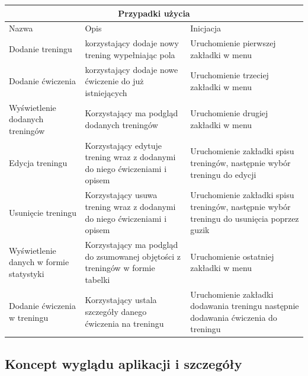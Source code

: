 \documentclass[8pt]{article}
\begin{document}
\renewcommand{\arraystretch}{1}
\begin{tabular}{ | p{5.2cm} | p{5.2cm} | p{5.2cm} | }
  \hline
  \multicolumn{3}{|c|}{Przypadki użycia} \\\hline
  Nazwa & Opis & Inicjacja \\\hline
  Dodanie treningu & korzystający dodaje nowy trening wypełniając pola & Uruchomienie
  pierwszej zakładki w menu \\\hline
  Dodanie ćwiczenia & korzystający dodaje nowe ćwiczenie do już istniejących & Uruchomienie trzeciej zakładki w menu \\\hline
  Wyświetlenie dodanych treningów & Korzystający ma podgląd dodanych treningów & Uruchomienie drugiej zakładki w menu \\\hline
  Edycja treningu & Korzystający edytuje trening wraz z dodanymi do niego ćwiczeniami i opisem & Uruchomienie zakładki spisu treningów, następnie wybór treningu do edycji \\\hline
  Usunięcie treningu & Korzystający usuwa trening wraz z dodanymi do niego ćwiczeniami i opisem & Uruchomienie zakładki spisu treningów, następnie wybór treningu do usunięcia poprzez guzik \\\hline
  Wyświetlenie danych w formie statystyki & Korzystający ma podgląd do zsumowanej objętości z treningów w formie tabelki & Uruchomienie ostatniej zakładki w menu \\\hline
  Dodanie ćwiczenia w treningu & Korzystający ustala szczegóły danego ćwiczenia na treningu & Uruchomienie zakładki dodawania treningu następnie dodawania ćwiczenia do treningu \\\hline
  
  \hline
\end{tabular}
\subsection*{ Koncept wyglądu aplikacji i szczegóły}
\end{document}
